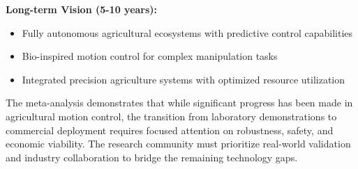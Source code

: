 \textbf{Long-term Vision (5-10 years):}
\begin{itemize}
    \item Fully autonomous agricultural ecosystems with predictive control capabilities
    \item Bio-inspired motion control for complex manipulation tasks
    \item Integrated precision agriculture systems with optimized resource utilization
\end{itemize}

The meta-analysis demonstrates that while significant progress has been made in agricultural motion control, the transition from laboratory demonstrations to commercial deployment requires focused attention on robustness, safety, and economic viability. The research community must prioritize real-world validation and industry collaboration to bridge the remaining technology gaps.